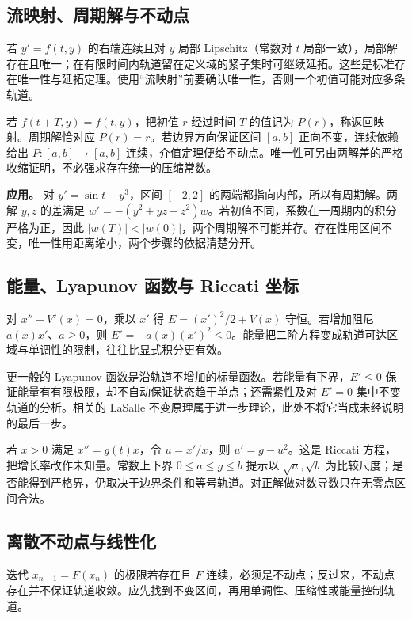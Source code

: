 \documentclass[12pt,fontset=fandol]{ctexart}
\begin{document}
\subsection{流映射、周期解与不动点}

\label{app:dynamics-flow}

若 $y'=f(t,y)$ 的右端连续且对 $y$ 局部 Lipschitz（常数对 $t$ 局部一致），局部解存在且唯一；在有限时间内轨道留在定义域的紧子集时可继续延拓。这些是标准存在唯一性与延拓定理。使用“流映射”前要确认唯一性，否则一个初值可能对应多条轨道。

若 $f(t+T,y)=f(t,y)$，把初值 $r$ 经过时间 $T$ 的值记为 $P(r)$，称返回映射。周期解恰对应 $P(r)=r$。若边界方向保证区间 $[a,b]$ 正向不变，连续依赖给出 $P:[a,b]\to[a,b]$ 连续，介值定理便给不动点。唯一性可另由两解差的严格收缩证明，不必强求存在统一的压缩常数。

\textbf{应用。} 对 $y'=\sin t-y^3$，区间 $[-2,2]$ 的两端都指向内部，所以有周期解。两解 $y,z$ 的差满足 $w'=-(y^2+yz+z^2)w$。若初值不同，系数在一周期内的积分严格为正，因此 $|w(T)|<|w(0)|$，两个周期解不可能并存。存在性用区间不变，唯一性用距离缩小，两个步骤的依据清楚分开。

\subsection{能量、Lyapunov 函数与 Riccati 坐标}

\label{app:dynamics-energy}

对 $x''+V'(x)=0$，乘以 $x'$ 得 $E=(x')^2/2+V(x)$ 守恒。若增加阻尼 $a(x)x'$、$a\geq0$，则 $E'=-a(x)(x')^2\leq0$。能量把二阶方程变成轨道可达区域与单调性的限制，往往比显式积分更有效。

更一般的 Lyapunov 函数是沿轨道不增加的标量函数。若能量有下界，$E'\leq0$ 保证能量有有限极限，却不自动保证状态趋于单点；还需紧性及对 $E'=0$ 集中不变轨道的分析。相关的 LaSalle 不变原理属于进一步理论，此处不将它当成未经说明的最后一步。

若 $x>0$ 满足 $x''=g(t)x$，令 $u=x'/x$，则 $u'=g-u^2$。这是 Riccati 方程，把增长率改作未知量。常数上下界 $0\leq a\leq g\leq b$ 提示以 $\sqrt a,\sqrt b$ 为比较尺度；是否能得到严格界，仍取决于边界条件和等号轨道。对正解做对数导数只在无零点区间合法。

\subsection{离散不动点与线性化}

\label{app:dynamics-iteration}

迭代 $x_{n+1}=F(x_n)$ 的极限若存在且 $F$ 连续，必须是不动点；反过来，不动点存在并不保证轨道收敛。应先找到不变区间，再用单调性、压缩性或能量控制轨道。
\end{document}
